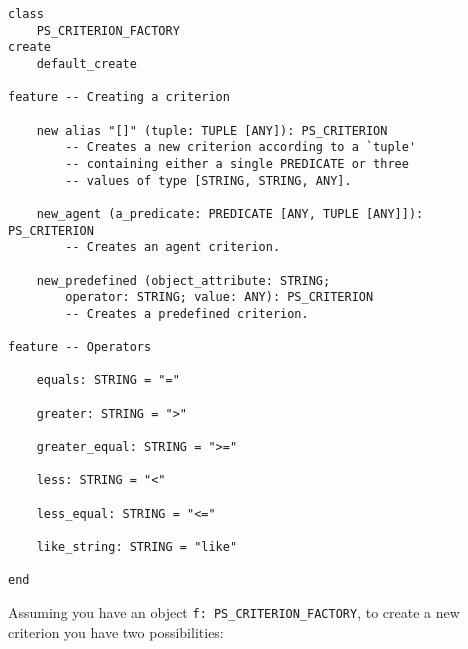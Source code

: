 \documentclass[a4paper,12pt]{report}
\begin{document}
\begin{lstlisting}[language=OOSC2Eiffel, captionpos=b, caption={The CRITERION\_FACTORY class interface}, label={lst:factory_interface}]
class
	PS_CRITERION_FACTORY
create
	default_create

feature -- Creating a criterion

	new alias "[]" (tuple: TUPLE [ANY]): PS_CRITERION
		-- Creates a new criterion according to a `tuple'
		-- containing either a single PREDICATE or three 
		-- values of type [STRING, STRING, ANY].

	new_agent (a_predicate: PREDICATE [ANY, TUPLE [ANY]]): PS_CRITERION
		-- Creates an agent criterion.

	new_predefined (object_attribute: STRING; 
		operator: STRING; value: ANY): PS_CRITERION
		-- Creates a predefined criterion.

feature -- Operators

	equals: STRING = "="

	greater: STRING = ">"

	greater_equal: STRING = ">="

	less: STRING = "<"

	less_equal: STRING = "<="

	like_string: STRING = "like"

end
\end{lstlisting}

Assuming you have an object \lstinline{f: PS_CRITERION_FACTORY}, to create a new criterion you have  two possibilities:
\end{document}

